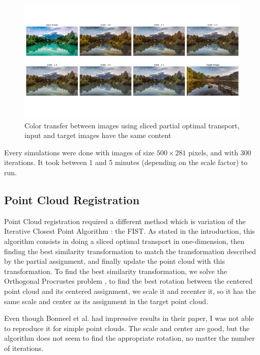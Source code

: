 \documentclass[a4paper,12pt]{article}
\begin{document}
\begin{figure}[H]
\includegraphics[trim=0cm 3cm 0cm 1.5cm, width = \columnwidth]{landscape12.pdf}
\caption{Color transfer between images using sliced partial optimal transport, input and target images have the same content}\label{12_fig}
\end{figure}

Every simulations were done with images of size $500 \times 281$ pixels, and with 300 iterations. It took between 1 and 5 minutes (depending on the scale factor) to run.

\subsection{Point Cloud Registration}

Point Cloud registration required a different method which is variation of the Iterative Closest Point Algorithm : the FIST. As stated in the introduction, this algorithm consists in doing a sliced optimal transport in one-dimension, then finding the best similarity transformation to match the transformation described by the partial assignment, and finally update the point cloud with this transformation. To find the best similarity transformation, we solve the Orthogonal Procrustes problem \cite{schonemann1966generalized}, to find the best rotation between the centered point cloud and its centered assignment, we scale it and recenter it, so it has the same scale and center as its assignment in the target point cloud.

Even though Bonneel et al. had impressive results in their paper, I was not able to reproduce it for simple point clouds. The scale and center are good, but the algorithm does not seem to find the appropriate rotation, no matter the number of iterations.
\end{document}
